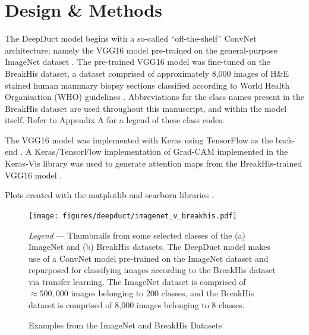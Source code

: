 \section{Design \& Methods}

The DeepDuct model begins with a so-called ``off-the-shelf'' ConvNet architecture; namely the VGG16 model pre-trained on the general-purpose ImageNet dataset \citep{simonyan2014,deng2009,imagenet}. The pre-trained VGG16 model was fine-tuned on the BreakHis dataset, a dataset comprised of approximately 8,000 images of H\&E stained human mammary biopsy sections classified according to World Health Organisation (WHO) guidelines \citep{spanhol2016, who_breast}. Abbreviations for the class names present in the BreakHis dataset are used throughout this manuscript, and within the model itself. Refer to Appendix A for a legend of these class codes. \par

The VGG16 model was implemented with Keras using TensorFlow as the back-end \citep{chollet2015, tensorflow}. A Keras/TensorFlow implementation of Grad-CAM implemented in the Keras-Vis library was used to generate attention maps from the BreakHis-trained VGG16 model \citep{raghakot}.\par

Plots created with the matplotlib and searborn libraries \citep{hunter2007, seaborn}.

\begin{figure}[h]
	\begin{center}
		\caption{Examples from the ImageNet and BreakHis Datasets \label{fig:imagenet_v_breakhis}}
	\end{center}
	\texttt{[image: figures/deepduct/imagenet\_v\_breakhis.pdf]}
	\begin{singlespace}
		\textit{Legend} --- Thumbnails from some selected classes of the (a) ImageNet and (b) BreakHis datasets. The DeepDuct model makes use of a ConvNet model pre-trained on the ImageNet dataset and repurposed for classifying images according to the BreakHis dataset via transfer learning. The ImageNet dataset is comprised of $\approx500,000$ images belonging to 200 classes, and the BreakHis dataset is comprised of 8,000 images belonging to 8 classes. 
	\end{singlespace}
	
\end{figure}

